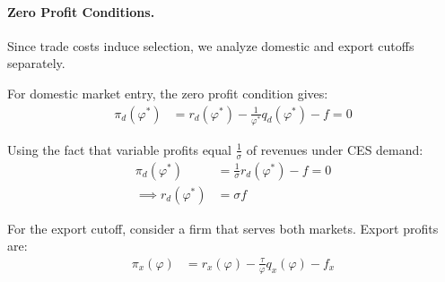 \begin{solution}
	\paragraph{Zero Profit Conditions.} Since trade costs induce selection, we analyze domestic and export cutoffs separately.

	For domestic market entry, the zero profit condition gives:
	\begin{align*}
		\pi_d(\varphi^*) &= r_d(\varphi^*) - \frac{1}{\varphi^*} q_d(\varphi^*) - f = 0
	\end{align*}

	Using the fact that variable profits equal $\frac{1}{\sigma}$ of revenues under CES demand:
	\begin{align*}
		\pi_d(\varphi^*) &= \frac{1}{\sigma} r_d(\varphi^*) - f = 0 \\
		\implies r_d(\varphi^*) &= \sigma f
	\end{align*}

	For the export cutoff, consider a firm that serves both markets. Export profits are:
	\begin{align*}
		\pi_x(\varphi) &= r_x(\varphi) - \frac{\tau}{\varphi} q_x(\varphi) - f_x
	\end{align*}


\end{solution}
